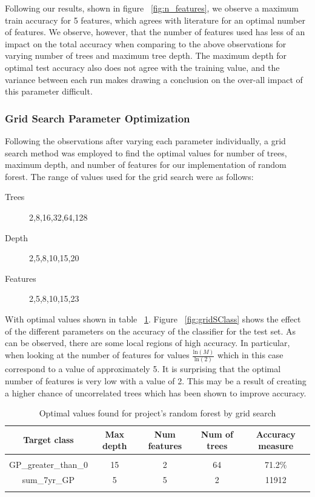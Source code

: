 \documentclass{article} %
\begin{document}
Following our results, shown in figure ~\ref{fig:n_features}, we observe a maximum train accuracy for 5 features, which agrees with literature for an optimal number of features. We observe, however, that the number of features used has less of an impact on the total accuracy when comparing to the above observations for varying number of trees and maximum tree depth. The maximum depth for optimal test accuracy also does not agree with the training value, and the variance between each run makes drawing a conclusion on the over-all impact of this parameter difficult.

\subsubsection{Grid Search Parameter Optimization}

Following the observations after varying each parameter individually, a grid search method was employed to find the optimal values for number of trees, maximum depth, and number of features for our implementation of random forest. The range of values used for the grid search were as follows:

\begin{description}
\item [Trees] 2,8,16,32,64,128
\item [Depth] 2,5,8,10,15,20
\item [Features] 2,5,8,10,15,23
\end{description}

With optimal values shown in table ~\ref{opt-table}. Figure ~\ref{fig:gridSClass} shows the effect of the different parameters on the accuracy of the classifier for the test set. As can be observed, there are some local regions of high accuracy. In particular, when looking at the number of features for values $\frac{\text{ln}(M)}{\text{ln}(2)}$ which in this case correspond to a value of approximately 5. It is surprising that the optimal number of features is very low with a value of 2. This may be a result of creating a higher chance of uncorrelated trees which has been shown to improve accuracy. \cite{Bharathidason2014}

\begin{table}[h]
\caption{Optimal values found for project's random forest by grid search}
\begin{center}
\begin{tabular}{ccccc}
{\bf Target class} &{\bf Max depth} &{\bf Num features} &{\bf Num of trees}&{\bf Accuracy measure}
\\ \hline \\
GP\_greater\_than\_0         &15	&2	&64 &71.2\%\\
sum\_7yr\_GP         &5	&5	&2 		&11912\\
\label{opt-table}
\end{tabular}
\end{center}
\end{table}
\end{document}
